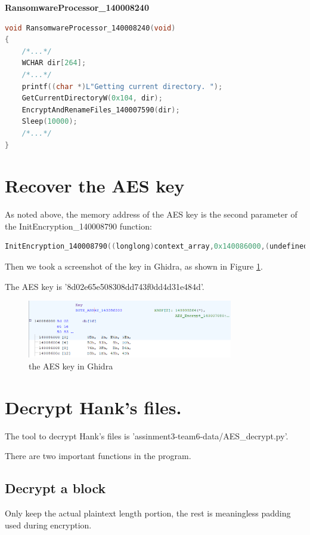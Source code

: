 \documentclass[11pt]{article}
\begin{document}
\textbf{RansomwareProcessor\_140008240}
\begin{lstlisting}[language=c++, caption=RansomwareProcessor\_140008240]
void RansomwareProcessor_140008240(void)
{
    /*...*/
    WCHAR dir[264];
    /*...*/
    printf((char *)L"Getting current directory. ");
    GetCurrentDirectoryW(0x104, dir);
    EncryptAndRenameFiles_140007590(dir);
    Sleep(10000);
    /*...*/
}
\end{lstlisting}




\section{Recover the AES key}
As noted above, the memory address of the AES key is the second parameter of the InitEncryption\_140008790 function:
\begin{lstlisting}[language=c++, caption=call of InitEncryption\_140008790]
InitEncryption_140008790((longlong)context_array,0x140086000,(undefined8 *)IV_140086010);                              /*Address of AES key*/
\end{lstlisting}

Then we took a screenshot of the key in Ghidra, as shown in Figure \ref{fig:key}.

The AES key is '8d02e65e508308dd743f0dd4d31e484d'.
\begin{figure}[htbp]
    \centering
    \includegraphics[width=0.8\textwidth]{img/key.png}
    \caption{the AES key in Ghidra}
    \label{fig:key}
\end{figure}

\section{Decrypt Hank's files.}
The tool to decrypt Hank's files is 'assinment3-team6-data/AES\_decrypt.py'.

There are two important functions in the program.

\subsection{Decrypt a block}
Only keep the actual plaintext length portion, the rest is meaningless padding used during encryption.
\end{document}
